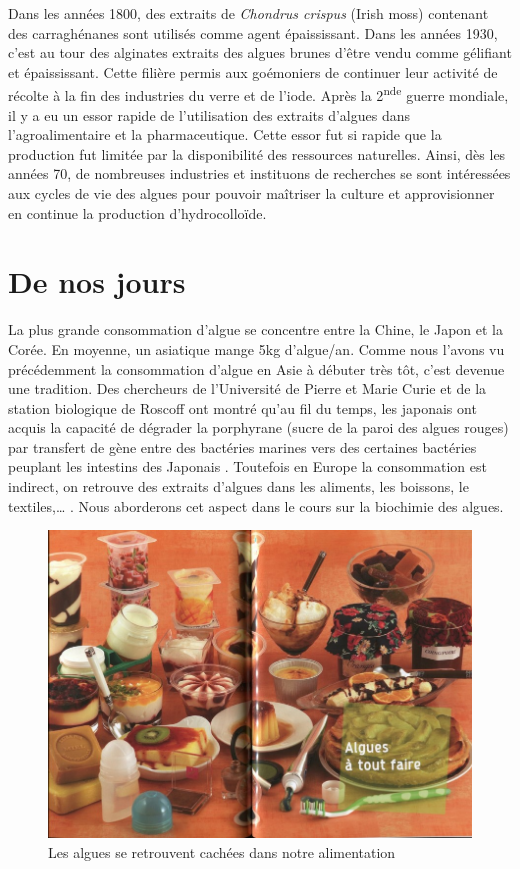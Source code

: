 \documentclass[
]{book}
\begin{document}
Dans les années 1800, des extraits de \emph{Chondrus crispus} (Irish moss) contenant des carraghénanes sont utilisés comme agent épaississant. Dans les années 1930, c'est au tour des alginates extraits des algues brunes d'être vendu comme gélifiant et épaississant. Cette filière permis aux goémoniers de continuer leur activité de récolte à la fin des industries du verre et de l'iode. Après la 2\textsuperscript{nde} guerre mondiale, il y a eu un essor rapide de l'utilisation des extraits d'algues dans l'agroalimentaire et la pharmaceutique. Cette essor fut si rapide que la production fut limitée par la disponibilité des ressources naturelles. Ainsi, dès les années 70, de nombreuses industries et instituons de recherches se sont intéressées aux cycles de vie des algues pour pouvoir maîtriser la culture et approvisionner en continue la production d'hydrocolloïde.

\hypertarget{de-nos-jours}{%
\section{De nos jours}\label{de-nos-jours}}

La plus grande consommation d'algue se concentre entre la Chine, le Japon et la Corée. En moyenne, un asiatique mange 5kg d'algue/an. Comme nous l'avons vu précédemment la consommation d'algue en Asie à débuter très tôt, c'est devenue une tradition. Des chercheurs de l'Université de Pierre et Marie Curie et de la station biologique de Roscoff ont montré qu'au fil du temps, les japonais ont acquis la capacité de dégrader la porphyrane (sucre de la paroi des algues rouges) par transfert de gène entre des bactéries marines vers des certaines bactéries peuplant les intestins des Japonais \citep{hehemann2010}.
Toutefois en Europe la consommation est indirect, on retrouve des extraits d'algues dans les aliments, les boissons, le textiles,\ldots{} .
Nous aborderons cet aspect dans le cours sur la biochimie des algues.

\begin{figure}

{\centering \includegraphics{images/alguetoutfaire} 

}

\caption{Les algues se retrouvent cachées dans notre alimentation}\label{fig:algueatoutfaire}
\end{figure}
\end{document}
